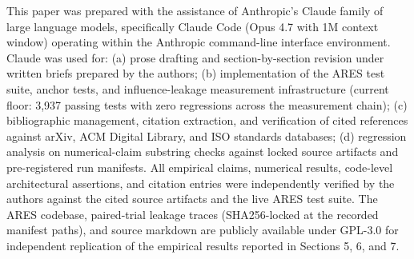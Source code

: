 \documentclass[sigconf,anonymous,review,nonacm=false]{acmart}
\begin{document}
This paper was prepared with the assistance of Anthropic's Claude family of large language models, specifically Claude Code (Opus 4.7 with 1M context window) operating within the Anthropic command-line interface environment. Claude was used for: (a) prose drafting and section-by-section revision under written briefs prepared by the authors; (b) implementation of the ARES test suite, anchor tests, and influence-leakage measurement infrastructure (current floor: 3,937 passing tests with zero regressions across the measurement chain); (c) bibliographic management, citation extraction, and verification of cited references against arXiv, ACM Digital Library, and ISO standards databases; (d) regression analysis on numerical-claim substring checks against locked source artifacts and pre-registered run manifests. All empirical claims, numerical results, code-level architectural assertions, and citation entries were independently verified by the authors against the cited source artifacts and the live ARES test suite. The ARES codebase, paired-trial leakage traces (SHA256-locked at the recorded manifest paths), and source markdown are publicly available under GPL-3.0 for independent replication of the empirical results reported in Sections 5, 6, and 7.


\label{end-of-appendix}
\end{document}
